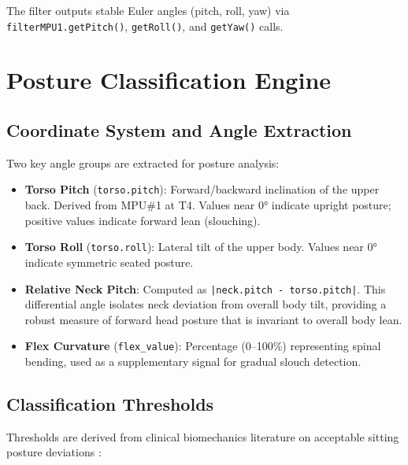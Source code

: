 \documentclass[12pt,a4paper]{report}
\newcommand{\code}[1]{\texttt{\small\color{accentviolet}#1}}
\begin{document}
The filter outputs stable Euler angles (pitch, roll, yaw) via \code{filterMPU1.getPitch()}, \code{getRoll()}, and \code{getYaw()} calls.

\section{Posture Classification Engine}

\subsection{Coordinate System and Angle Extraction}

Two key angle groups are extracted for posture analysis:

\begin{itemize}[leftmargin=2em]
    \item \textbf{Torso Pitch} (\code{torso.pitch}): Forward/backward inclination of the upper back. Derived from MPU\#1 at T4. Values near 0° indicate upright posture; positive values indicate forward lean (slouching).
    \item \textbf{Torso Roll} (\code{torso.roll}): Lateral tilt of the upper body. Values near 0° indicate symmetric seated posture.
    \item \textbf{Relative Neck Pitch}: Computed as \code{|neck.pitch - torso.pitch|}. This differential angle isolates neck deviation from overall body tilt, providing a robust measure of forward head posture that is invariant to overall body lean.
    \item \textbf{Flex Curvature} (\code{flex\_value}): Percentage (0--100\%) representing spinal bending, used as a supplementary signal for gradual slouch detection.
\end{itemize}

\subsection{Classification Thresholds}

Thresholds are derived from clinical biomechanics literature on acceptable sitting posture deviations \cite{claus2016, straker2009}:
\end{document}
